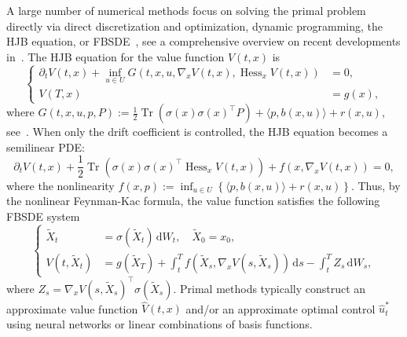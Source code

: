 \documentclass[11pt]{article}
\numberwithin{equation}{section}
\theoremstyle{plain}
\theoremstyle{definition}
\theoremstyle{remark}
\newcommand{\op}{\operatorname}
\newcommand{\dd}{\mathrm{d}}
\begin{document}
A large number of numerical methods focus on solving the primal problem directly via direct discretization and optimization, dynamic programming, the HJB equation, or FBSDE~\cite{han2016deep, E2017deepbsde, bachouch2022deep, zhou2024solving, li2024neural}, see a comprehensive overview on recent developments in~\cite{hu2024recent}. The HJB equation for the value function $V(t,x)$ is 
\begin{equation*}
\left\{\begin{aligned}
        \partial_t V(t,x) + \inf_{u\in U} G\left(t,x,u, \nabla_x V(t,x), \op{Hess}_x V(t,x)\right) &= 0, \\
        V(T,x) &= g(x), 
    \end{aligned}\right.
\end{equation*}
where $G(t,x,u,p,P) := \frac{1}{2}\op{Tr}(\sigma(x)\sigma(x)^\top P) + \langle p, b(x,u) \rangle + r(x,u)$, see~\cite{yong1999stochastic}. When only the drift coefficient is controlled, the HJB equation becomes a semilinear PDE: 
\begin{equation} \label{eq:nonlinear-pde}
    \partial_t V(t,x) + \frac{1}{2}\op{Tr}\left(\sigma(x)\sigma(x)^\top \op{Hess}_x V(t,x)\right) + f(x, \nabla_x V(t,x)) = 0, 
\end{equation}
where the nonlinearity $f(x, p) := \inf_{u\in U}\left\{ \langle p, b(x,u)\rangle + r(x,u) \right\}$. Thus, by the nonlinear Feynman-Kac formula, the value function satisfies the following FBSDE system 
\begin{equation*}
\left\{\begin{aligned}
    \tilde{X}_t &= \sigma(\tilde{X}_t) \,\dd W_t, \quad \tilde{X}_0 = x_0, \\
    V(t, \tilde{X}_t) &= g(\tilde{X}_T) + \int_t^T f(\tilde{X}_s, \nabla_x V(s, \tilde{X}_s))\,\dd s - \int_t^T Z_s\,\dd W_s, 
\end{aligned}\right. 
\end{equation*}
where $Z_s = \nabla_xV(s, \tilde{X}_s)^\top \sigma(\tilde{X}_s)$. 
Primal methods typically construct an approximate value function $\hat{V}(t,x)$ and/or an approximate optimal control $\hat{u}^*_t$ using neural networks or linear combinations of basis functions. 
\end{document}
